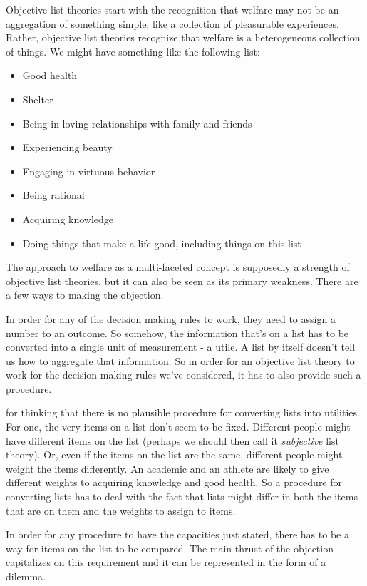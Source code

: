 \documentclass[]{tufte-book}
\providecommand{\tightlist}{%
  \setlength{\itemsep}{0pt}\setlength{\parskip}{0pt}}
\begin{document}
Objective list theories start with the recognition that welfare may not be an aggregation of something simple, like a collection of pleasurable experiences. Rather, objective list theories recognize that welfare is a heterogeneous collection of things. We might have something like the following list:

\begin{itemize}
\tightlist
\item
  Good health
\item
  Shelter
\item
  Being in loving relationships with family and friends
\item
  Experiencing beauty
\item
  Engaging in virtuous behavior
\item
  Being rational
\item
  Acquiring knowledge
\item
  Doing things that make a life good, including things on this list
\end{itemize}

The approach to welfare as a multi-faceted concept is supposedly a strength of objective list theories, but it can also be seen as its primary weakness. There are a few ways to making the objection.

In order for any of the decision making rules to work, they need to assign a number to an outcome. So somehow, the information that's on a list has to be converted into a single unit of measurement - a utile. A list by itself doesn't tell us how to aggregate that information. So in order for an objective list theory to work for the decision making rules we've considered, it has to also provide such a procedure.

 for thinking that there is no plausible procedure for converting lists into utilities. For one, the very items on a list don't seem to be fixed. Different people might have different items on the list (perhaps we should then call it \emph{subjective} list theory). Or, even if the items on the list are the same, different people might weight the items differently. An academic and an athlete are likely to give different weights to acquiring knowledge and good health. So a procedure for converting lists has to deal with the fact that lists might differ in both the items that are on them and the weights to assign to items.

In order for any procedure to have the capacities just stated, there has to be a way for items on the list to be compared. The main thrust of the objection capitalizes on this requirement and it can be represented in the form of a dilemma.
\end{document}
